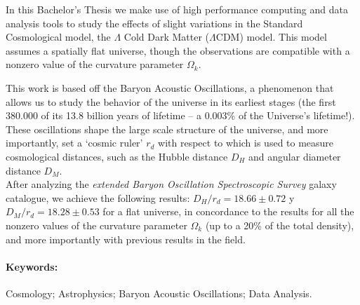 In this Bachelor's Thesis we make use of high performance computing and data analysis tools to study the effects of slight variations in the Standard Cosmological model, the $\Lambda$ Cold Dark Matter ($\Lambda$CDM) model. This model assumes a spatially flat universe, though the observations are compatible with a nonzero value of the curvature parameter $\Omega_k$.

This work is based off the Baryon Acoustic Oscillations, a phenomenon that allows us to study the behavior of the universe in its earliest stages (the first 380.000 of its 13.8 billion years of lifetime -- a 0.003\% of the Universe's lifetime!). These oscillations shape the large scale structure of the universe, and more importantly, set a `cosmic ruler' $r_d$ with respect to which is used to measure cosmological distances, such as the Hubble distance $D_H$ and angular diameter distance $D_M$.\\

After analyzing the \textit{extended Baryon Oscillation Spectroscopic Survey }galaxy catalogue, we achieve the following results: $D_H/r_d = 18.66\pm 0.72$ y $D_M/r_d = 18.28\pm 0.53$ for a flat universe, in concordance to the results for all the nonzero values of the curvature parameter $\Omega_k$ (up to a 20\% of the total density), and more importantly with previous results in the field.





\paragraph{Keywords:} Cosmology; Astrophysics; Baryon Acoustic Oscillations; Data Analysis.

